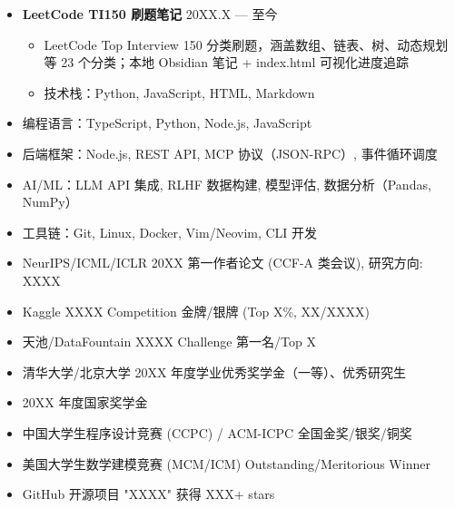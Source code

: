 \documentclass[zh]{resume}
\begin{document}
\begin{itemize}
    技术栈：TypeScript, Python, Pandas, NumPy, scikit-learn \\
    项目地址：\url{https://github.com/dok4everak47/agent-harness-analysis}


    \item \textbf{LeetCode TI150 刷题笔记} \hfill 20XX.X --- 至今
    \begin{itemize}
        \item LeetCode Top Interview 150 分类刷题，涵盖数组、链表、树、动态规划等 23 个分类；本地 Obsidian 笔记 + index.html 可视化进度追踪
        \item 技术栈：Python, JavaScript, HTML, Markdown
    \end{itemize}
\end{itemize}

\begin{itemize}
    \item 编程语言：TypeScript, Python, Node.js, JavaScript
    \item 后端框架：Node.js, REST API, MCP 协议（JSON-RPC）, 事件循环调度
    \item AI/ML：LLM API 集成, RLHF 数据构建, 模型评估, 数据分析（Pandas, NumPy）
    \item 工具链：Git, Linux, Docker, Vim/Neovim, CLI 开发
\end{itemize}

\begin{itemize}
    \item NeurIPS/ICML/ICLR 20XX 第一作者论文 (CCF-A 类会议), 研究方向: XXXX
    \item Kaggle XXXX Competition 金牌/银牌 (Top X\%, XX/XXXX)
    \item 天池/DataFountain XXXX Challenge 第一名/Top X
    \item 清华大学/北京大学 20XX 年度学业优秀奖学金（一等）、优秀研究生
    \item 20XX 年度国家奖学金
    \item 中国大学生程序设计竞赛 (CCPC) / ACM-ICPC 全国金奖/银奖/铜奖
    \item 美国大学生数学建模竞赛 (MCM/ICM) Outstanding/Meritorious Winner
    \item GitHub 开源项目 "XXXX" 获得 XXX+ stars
\end{itemize}
\end{document}
